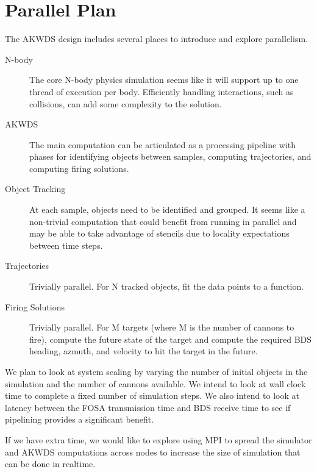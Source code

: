 \section{Parallel Plan}

The AKWDS design includes several places to introduce and explore parallelism.

\begin{description}
\item[N-body] The core N-body physics simulation seems like it will support up to one thread of execution per body. Efficiently handling interactions, such as collisions, can add some complexity to the solution.
\item[AKWDS] The main computation can be articulated as a processing pipeline with phases for identifying objects between samples, computing trajectories, and computing firing solutions.
\item[Object Tracking] At each sample, objects need to be identified and grouped. It seems like a non-trivial computation that could benefit from running in parallel and may be able to take advantage of stencils due to locality expectations between time steps.
\item[Trajectories] Trivially parallel. For N tracked objects, fit the data points to a function.
\item[Firing Solutions] Trivially parallel. For M targets (where M is the number of cannons to fire), compute the future state of the target and compute the required BDS heading, azmuth, and velocity to hit the target in the future.
\end{description}

We plan to look at system scaling by varying the number of initial objects in the simulation and the number of cannons available. We intend to look at wall clock time to complete a fixed number of simulation steps. We also intend to look at latency between the FOSA transmission time and BDS receive time to see if pipelining provides a significant benefit.

If we have extra time, we would like to explore using MPI to spread the simulator and AKWDS computations across nodes to increase the size of simulation that can be done in realtime.
